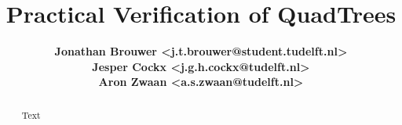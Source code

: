 \documentclass[english]{article}
\begin{document}
\title{\textbf{Practical Verification of QuadTrees}}
\author{
	\textbf{Jonathan Brouwer <j.t.brouwer@student.tudelft.nl>} \\ 
	\textbf{Jesper Cockx <j.g.h.cockx@tudelft.nl>} \\ 
	\textbf{Aron Zwaan <a.s.zwaan@tudelft.nl>} \\ 
}
\maketitle

\begin{abstract}
Text
\end{abstract}





\end{document}
